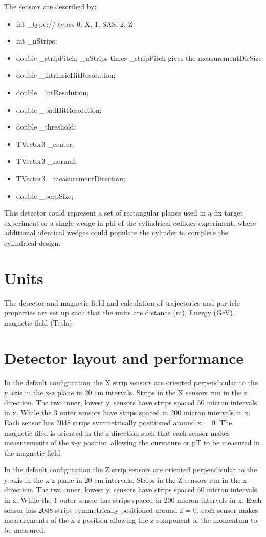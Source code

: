 \documentclass[aps,prd,superscriptaddress,floatfix]{revtex4}
\begin{document}
The sensors are described by:
\begin{itemize}
\item   int \_type;// types 0: X, 1, SAS, 2, Z
\item  int \_nStrips;
\item   double \_stripPitch; \_nStrips times \_stripPitch gives the measurementDirSize
\item   double \_intrinsicHitResolution;
\item   double \_hitResolution;
\item   double \_badHitResolution;
\item  double \_threshold;
\item  TVector3 \_center;
\item  TVector3 \_normal;
\item  TVector3 \_measurementDirection;
\item  double \_perpSize;
\end{itemize}

This detector could represent a set of rectangular planes used in a fix target experiment
or a single wedge in phi of the cylindrical collider experiment, where additional identical
wedges could populate the cylinder to complete the cylindrical design.

\section{Units}
 The detector and magnetic field and calculation of trajectories and particle properties are set up such that the units are distance (m), Energy (GeV), magnetic field (Tesla).


\section{Detector layout and performance}
In the default configuration the X strip sensors are oriented perpendicular to the y axis in
the x-z plane in 20 cm intervals.  Strips in the X sensors run in the z
direction.  The two inner, lowest y,  sensors have strips spaced 50 micron
intervals in x. While the 3 outer sensors have strips spaced in 200 micron
intervals in x.  Each sensor has 2048 strips symmetrically positioned
around x = 0.  The magnetic filed is oriented in the z direction such
that each sensor makes measurements of the x-y position allowing
the curvature or pT to be measured in the magnetic field.

In the default configuration the Z strip sensors are oriented perpendicular to the y axis in
the x-z plane in 20 cm intervals.  Strips in the Z sensors run in the x
direction.  The two inner, lowest y,  sensors have strips spaced 50 micron
intervals in x. While the 1 outer sensor has strips spaced in 200 micron
intervals in x.  Each sensor has 2048 strips symmetrically positioned
around z = 0.  each sensor makes measurements of the x-z position allowing
the z component of the momentum to be measured.
\end{document}
